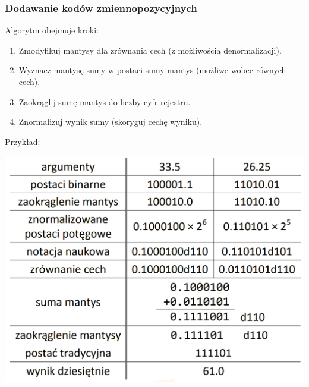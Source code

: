 \documentclass[12pt]{article}
\begin{document}
    \subsubsection{Dodawanie kodów zmiennopozycyjnych}
    Algorytm obejmuje kroki:
    \begin{enumerate}
        \item Zmodyfikuj mantysy dla zrównania cech (z możliwością
        denormalizacji).
        \item Wyznacz mantysę sumy w postaci sumy mantys (możliwe wobec równych cech).
        \item Zaokrąglij sumę mantys do liczby cyfr rejestru.
        \item Znormalizuj wynik sumy (skoryguj cechę wyniku).
    \end{enumerate}
    Przykład:\\
    \begin{center}
        \includegraphics[scale=0.3]{graphics/number-repr/fl-pt-add.png}
    \end{center}
\end{document}
